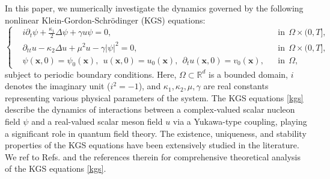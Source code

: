 \documentclass[fleqn,11pt]{elsarticle}
\numberwithin{equation}{section}
\begin{document}
In this paper, we numerically investigate the dynamics governed by the following nonlinear Klein-Gordon-Schrödinger (KGS) equations:
\begin{equation}\label{kgs}
	\left\lbrace\begin{aligned}
		 & i\partial_t\psi + \frac{\kappa_1}{2}\Delta \psi + \gamma u\psi = 0,                                 &  & \text{in}~~\Omega \times (0,T], \\
		 & \partial_{tt} u - \kappa_2 \Delta u + \mu^2 u - \gamma |\psi|^2 = 0,                                &  & \text{in}~~\Omega \times (0,T], \\
		 & \psi(\bm{x},0) = \psi_0(\bm{x}),~~u(\bm{x},0) = u_0(\bm{x}),~~\partial_t u(\bm{x},0) = v_0(\bm{x}), &  & \text{in}~~\Omega,
	\end{aligned}\right.
\end{equation}
subject to periodic boundary conditions. Here, $\Omega \subset \mathbb{R}^d$ is a bounded domain, $i$ denotes the imaginary unit ($i^2 = -1$), and $\kappa_1, \kappa_2, \mu, \gamma$ are real constants representing various physical parameters of the system. The KGS equations \eqref{kgs} describe the dynamics of interactions between a complex-valued scalar nucleon field $\psi$ and a real-valued scalar meson field $u$ via a Yukawa-type coupling, playing a significant role in quantum field theory. The existence, uniqueness, and stability properties of the KGS equations have been extensively studied in the literature. We ref to Refs. \cite{fukuda1975coupledI,fukuda1975yukawa,fukuda1978coupledII,fukuda1980coupledIII,guo1982global,guo1995asymptotic} and the references therein for comprehensive theoretical analysis of the KGS equations \eqref{kgs}.



%
\end{document}
